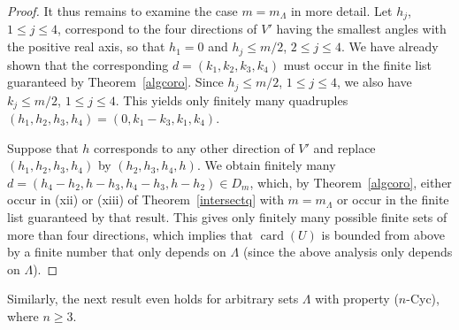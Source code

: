\documentclass[a4paper]{amsart}
\theoremstyle{definition}
\numberwithin{equation}{section}
\numberwithin{theorem}{section}
\begin{document}
\begin{proof}
It thus remains to examine the case $m=m_{\varLambda}$ in more detail. Let $h_j$,
$1\leq j\leq 4$, correspond to the four directions of $V'$ having the
smallest angles with the positive real axis, so that $h_1=0$ and
$h_j\leq m/2$, $2\leq j\leq 4$. We have already shown that the
corresponding $d=(k_1,k_2,k_3,k_4)$ must occur in the finite list 
guaranteed by Theorem~\ref{algcoro}.  Since $h_j\leq m/2$, $1\leq j\leq 4$, we
also have $k_j\leq m/2$, $1\leq j\leq 4$. This yields only
finitely many quadruples $(h_1,h_2,h_3,h_4)=(0,k_1-k_3,k_1,k_4)$.

Suppose that $h$ corresponds to any other direction of $V'$ and replace $(h_1,h_2,h_3,h_4)$ by
$(h_2,h_3,h_4,h)$. We obtain finitely many
$d=(h_4-h_2,h-h_3,h_4-h_3,h-h_2)\in D_m$, which, by
Theorem~\ref{algcoro},  either occur in (xii) or (xiii) of
Theorem~\ref{intersectq} with $m=m_{\varLambda}$ or occur
in the finite list guaranteed by that result. This gives only finitely many
possible finite sets of more than four directions, which implies that
$\operatorname{card}(U)$ is bounded from above by a finite number that
only depends on $\varLambda$ (since the above analysis only depends on $\varLambda$). 
\end{proof}

Similarly, the next result even holds for arbitrary sets $\varLambda$
with property ($n$-Cyc), where $n\geq 3$.
\end{document}

